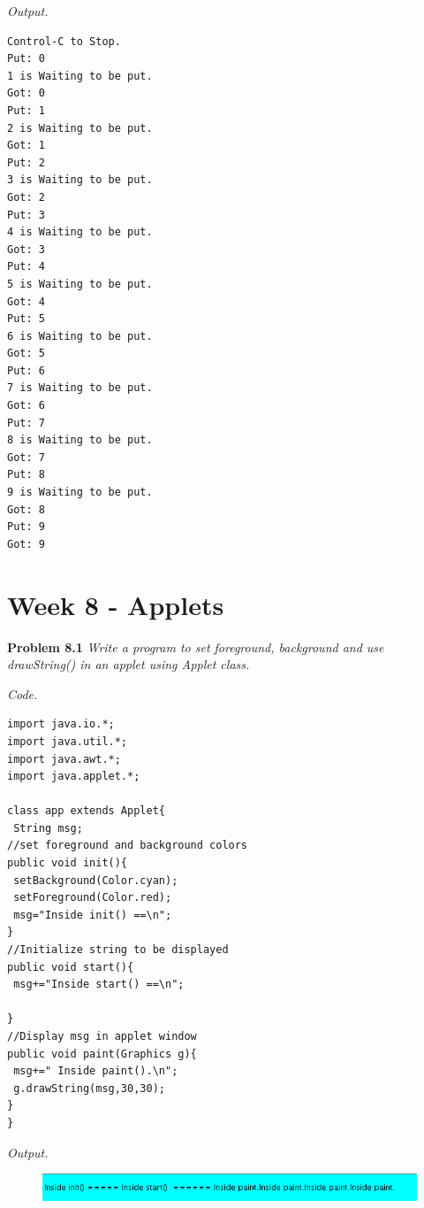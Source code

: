 \documentclass[12pt]{article}
\begin{document}
\textit{Output.}

\begin{lstlisting}
Control-C to Stop.
Put: 0
1 is Waiting to be put.
Got: 0
Put: 1
2 is Waiting to be put.
Got: 1
Put: 2
3 is Waiting to be put.
Got: 2
Put: 3
4 is Waiting to be put.
Got: 3
Put: 4
5 is Waiting to be put.
Got: 4
Put: 5
6 is Waiting to be put.
Got: 5
Put: 6
7 is Waiting to be put.
Got: 6
Put: 7
8 is Waiting to be put.
Got: 7
Put: 8
9 is Waiting to be put.
Got: 8
Put: 9
Got: 9
\end{lstlisting}

\newpage

\setlength{\fboxrule}{.5mm}\setlength{\fboxsep}{1.2mm}
\addtolength{\boxlength}{-4mm}
\begin{center}\end{center}
\vspace{5mm}

\section{Week 8 - Applets}

\textbf{Problem 8.1} \textit{Write a program to set foreground, background and use drawString() in an applet using Applet class.}

\textit{Code.}

\begin{lstlisting}
import java.io.*;
import java.util.*;
import java.awt.*;
import java.applet.*;

class app extends Applet{
 String msg;
//set foreground and background colors
public void init(){
 setBackground(Color.cyan);
 setForeground(Color.red);
 msg="Inside init() ==\n";
}
//Initialize string to be displayed
public void start(){
 msg+="Inside start() ==\n";

}
//Display msg in applet window
public void paint(Graphics g){
 msg+=" Inside paint().\n";
 g.drawString(msg,30,30);
}
}
\end{lstlisting}

\textit{Output.}

\begin{figure}[h!]
  \includegraphics[width=\linewidth]{img_applet_1.jpg}
  \label{fig:boat1}
\end{figure}
\end{document}
